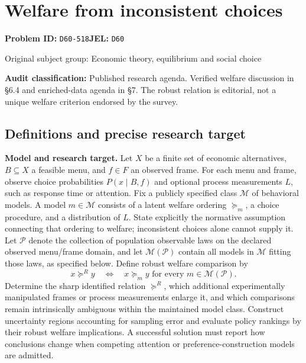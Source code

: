 \documentclass[11pt,a4paper]{article}
\begin{document}
\section*{Welfare from inconsistent choices}
\textbf{Problem ID:} \texttt{D60-518}\quad \textbf{JEL:} \texttt{D60}\par
\label{problem:OP-0273}
{\sffamily\small\color{muted}Original subject group: Economic theory, equilibrium and social choice\par}
\label{definitions:problem:30007554}
\textbf{Audit classification:} Published research agenda. Verified welfare discussion in §6.4 and enriched-data agenda in §7. The robust relation is editorial, not a unique welfare criterion endorsed by the survey.
\subsection*{Definitions and precise research target}
\textbf{Model and research target.} Let \(X\) be a finite set of economic alternatives, \(B\subseteq X\) a feasible menu, and \(f\in F\) an observed frame. For each menu and frame, observe choice probabilities \(P(x\mid B,f)\) and optional process measurements \(L\), such as response time or attention. Fix a publicly specified class \(\mathcal M\) of behavioral models. A model \(m\in\mathcal M\) consists of a latent welfare ordering \(\succeq_m\), a choice procedure, and a distribution of \(L\). State explicitly the normative assumption connecting that ordering to welfare; inconsistent choices alone cannot supply it. Let \(\mathcal P\) denote the collection of population observable laws on the declared observed menu/frame domain, and let \(\mathcal M(\mathcal P)\) contain all models in \(\mathcal M\) fitting those laws, as specified below. Define robust welfare comparison by
\[
 x\succeq^R y\quad\Longleftrightarrow\quad x\succeq_m y\text{ for every }m\in\mathcal M(\mathcal P).
\]
Determine the sharp identified relation \(\succeq^R\), which additional experimentally manipulated frames or process measurements enlarge it, and which comparisons remain intrinsically ambiguous within the maintained model class. Construct uncertainty regions accounting for sampling error and evaluate policy rankings by their robust welfare implications. A successful solution must report how conclusions change when competing attention or preference-construction models are admitted.
\end{document}
